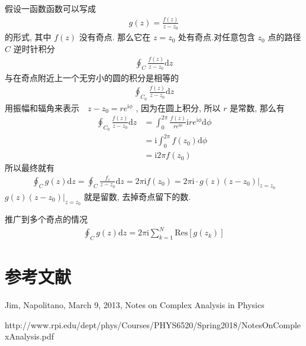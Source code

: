 \documentclass{ctexart}
\begin{document}
假设一函数函数可以写成
\begin{align*}
  g(z) = \frac{f(z)}{z - z_0}
\end{align*}
的形式, 其中 $f(z)$ 没有奇点. 那么它在 $z = z_0$ 处有奇点.对任意包含 $z_0$ 点的路径 $C$ 逆时针积分
\begin{align*}
  \oint_{C}\frac{f(z)}{z -z_0} \mathrm{d}z
\end{align*}
与在奇点附近上一个无穷小的圆的积分是相等的
\begin{align*}
  \oint_{C_0}\frac{f(z)}{z -z_0} \mathrm{d}z
\end{align*}
用振幅和辐角来表示　$z-z_{0} = r e^{\mathrm{i}\phi}$ , 因为在圆上积分, 所以 $r$ 是常数, 那么有
\begin{align*}
  \oint_{C_0}\frac{f(z)}{z -z_0} \mathrm{d}z &= \int_0^{2\pi}\frac{f(z)}{r e^{\mathrm{i}\phi}} \mathrm{i}re^{\mathrm{i}\phi}\mathrm{d}\phi \\
          &=\mathrm{i}\int_0^{2\pi} f(z_0) \mathrm{d}\phi \\
           &= \mathrm{i} 2\pi f(z_{0})
\end{align*}
所以最终就有
\begin{align*}
  \oint_{C}g(z)\mathrm{d}z = \oint_{C}\frac{f_z}{z -z_0}\mathrm{d}z = 2\pi \mathrm{i} f(z_0) = 2\pi \mathrm{i}\cdot g(z)(z-z_{0})|_{z=z_0}
\end{align*}
$g(z)(z-z_0)|_{z=z_0}$ 就是留数, 去掉奇点留下的数.

推广到多个奇点的情况
\begin{align*}
  \oint_C g(z) \mathrm{d}z = 2\pi \mathrm{i} \sum_{k=1}^N \mathrm{Res}[g(z_k)]
\end{align*}

\section{参考文献}

Jim, Napolitano, March 9, 2013, Notes on Complex Analysis in Physics

http://www.rpi.edu/dept/phys/Courses/PHYS6520/Spring2018/NotesOnComplexAnalysis.pdf
\end{document}
